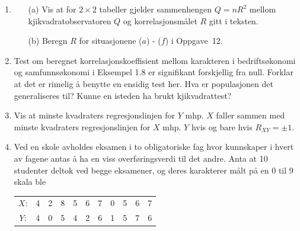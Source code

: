 \begin{enumerate}
\item
\begin{itemize}
\item[(a)] Vis at for $2\times 2$ tabeller gjelder sammenhengen 
$Q = nR^2$ mellom kjikvadratobservatoren $Q$ og korrelasjonsmålet
$R$ gitt i teksten.
\item[(b)] Beregn $R$ for situasjonene ($a$) - ($f$) i Oppgave~12.
\end{itemize}

\item
Test om beregnet korrelasjonskoeffisient mellom karakteren i
bedrifts\-økonomi og samfunnsøkonomi i Eksempel 1.8 er signifikant
forskjellig fra null.  Forklar at det er rimelig å benytte en
ensidig test her.  Hva er populasjonen det generaliseres til?  Kunne
en isteden ha brukt kjikvadrattest?

\item
Vis at minste kvadraters regresjonslinjen for $Y$ mhp. $X$ faller sammen
med minste kvadraters regresjonslinjen for $X$ mhp. $Y$ hvis og bare 
hvis $R_{XY} = \pm 1$.

\item
Ved en skole avholdes eksamen i to obligatoriske fag hvor kunnskaper i
hvert av fagene antas å ha en viss overføringsverdi til det andre.  
Anta at 10 studenter deltok ved begge eksamener, og deres karakterer
målt på en 0 til 9 skala ble 

\begin{center}
\begin{tabular}{ccccccccccc}
 $X$:  &  4 & 2 & 8 & 5 & 6 & 7 & 0 & 5 & 6 & 7  \\
 $Y$:  &  4 & 0 & 5 & 4 & 2 & 6 & 1 & 5 & 7 & 6  \\
\end{tabular}
\end{center}


\end{enumerate}
